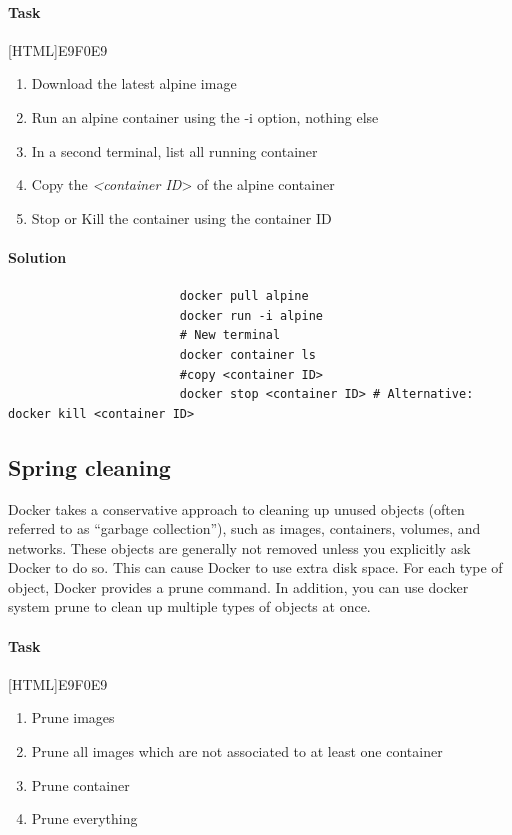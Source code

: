 \documentclass[12pt]{article}
\begin{document}
					\paragraph{Task}
						[HTML]{E9F0E9}{\parbox{\linewidth}{%
							\begin{enumerate}
								\item Download the latest alpine image
								\item Run an alpine container using the -i option, nothing else
								\item In a second terminal, list all running container
								\item Copy the \textit{<container ID}> of the alpine container
								\item Stop or Kill the container using the container ID
							\end{enumerate}
					}}
					
			\paragraph{Solution}	

				\begin{minipage}{\linewidth}
					\begin{lstlisting}
						docker pull alpine
						docker run -i alpine
						# New terminal
						docker container ls
						#copy <container ID>
						docker stop <container ID> # Alternative: docker kill <container ID>
					\end{lstlisting}
				\end{minipage}

				\subsection{Spring cleaning}
					Docker takes a conservative approach to cleaning up unused objects (often referred to as “garbage collection”), such as images, containers, volumes, and networks.
					These objects are generally not removed unless you explicitly ask Docker to do so. 
					This can cause Docker to use extra disk space. 
					For each type of object, Docker provides a prune command. 
					In addition, you can use docker system prune to clean up multiple types of objects at once. 
					
					\paragraph{Task}
						[HTML]{E9F0E9}{\parbox{\linewidth}{%
							\begin{enumerate}
								\item Prune images
								\item Prune all images which are not associated to at least one container
								\item Prune container
								\item Prune everything
							\end{enumerate}
						}}
				
\end{document}
